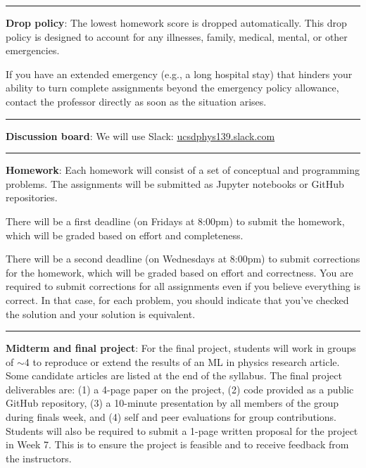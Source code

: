 \documentclass[12pt]{article}
\begin{document}
\begin{center}
	\rule{\textwidth}{0.5pt}
\end{center}

\noindent\textbf{Drop policy}: The lowest homework score is dropped automatically.
This drop policy is designed to account for any illnesses, family, medical, mental, or other emergencies.

If you have an extended emergency (e.g., a long hospital stay) that hinders your ability to turn complete assignments beyond the emergency policy allowance, contact the professor directly as soon as the situation arises.

\begin{center}
	\rule{\textwidth}{0.5pt}
\end{center}

\noindent\textbf{Discussion board}: We will use Slack: \href{https://join.slack.com/t/ucsdphys139/shared\_invite/zt-110gwd4lx-pZBsItfcxhbOD5BV6afVDA}{ucsdphys139.slack.com}

\begin{center}
	\rule{\textwidth}{0.5pt}
\end{center}

\noindent\textbf{Homework}: Each homework will consist of a set of conceptual and programming problems.
The assignments will be submitted as Jupyter notebooks or GitHub repositories.

There will be a first deadline (on Fridays at 8:00pm) to submit the homework, which will be graded based on effort and completeness.

There will be a second deadline (on Wednesdays at 8:00pm) to submit corrections for the homework, which will be graded based on effort and correctness.
You are required to submit corrections for all assignments even if you believe everything is correct.
In that case, for each problem, you should indicate that you've checked the solution and your solution is equivalent.

\begin{center}
	\rule{\textwidth}{0.5pt}
\end{center}

\noindent\textbf{Midterm and final project}:
For the final project, students will work in groups of $\sim$4 to reproduce or extend the results of an ML in physics research article.
Some candidate articles are listed at the end of the syllabus.
The final project deliverables are: (1) a 4-page paper on the project, (2) code provided as a public GitHub repository, (3) a 10-minute presentation by all members of the group during finals week, and (4) self and peer evaluations for group contributions.
Students will also be required to submit a 1-page written proposal for the project in Week 7.
This is to ensure the project is feasible and to receive feedback from the instructors.
\end{document}
